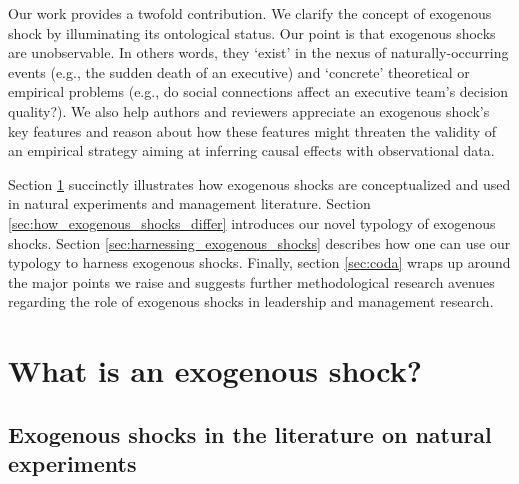 \begin{refsection}
Our work provides a twofold contribution. We  clarify the concept of exogenous
shock by illuminating its ontological status.  Our point is that exogenous
shocks are unobservable. In others words, they `exist' in the nexus of 
naturally-occurring events (e.g., the sudden death of an executive) and 
`concrete' theoretical or empirical problems
(e.g., do social connections affect an executive team's decision quality?).
We also help authors and reviewers appreciate an exogenous shock's key 
features and reason about how these features might threaten the validity of 
an empirical strategy aiming at inferring causal effects with observational 
data.

Section \ref{sec:what_exogenous_shocks} succinctly illustrates how exogenous 
shocks are conceptualized and used in natural experiments and management
literature.  Section \ref{sec:how_exogenous_shocks_differ} introduces our novel
typology of exogenous shocks.  Section \ref{sec:harnessing_exogenous_shocks}
describes how one can use our typology to harness exogenous shocks. Finally,
section \ref{sec:coda} wraps up around the major points we raise and suggests
further methodological research avenues regarding the role of exogenous shocks
in leadership and management research.

\section{What is an exogenous shock?}
\label{sec:what_exogenous_shocks}

\subsection{Exogenous shocks in the literature on natural experiments}
\label{subsec:exogenous_shocks_and_ne}


\end{refsection}
